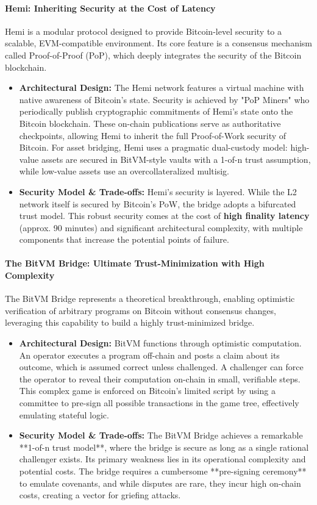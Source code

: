\documentclass{DESSThesis}
\begin{document}
\paragraph{Hemi: Inheriting Security at the Cost of Latency}
Hemi \cite{hemi2025} is a modular protocol designed to provide Bitcoin-level security to a scalable, EVM-compatible environment. Its core feature is a consensus mechanism called Proof-of-Proof (PoP), which deeply integrates the security of the Bitcoin blockchain.
\begin{itemize}
    \item \textbf{Architectural Design:} The Hemi network features a virtual machine with native awareness of Bitcoin's state. Security is achieved by "PoP Miners" who periodically publish cryptographic commitments of Hemi's state onto the Bitcoin blockchain. These on-chain publications serve as authoritative checkpoints, allowing Hemi to inherit the full Proof-of-Work security of Bitcoin. For asset bridging, Hemi uses a pragmatic dual-custody model: high-value assets are secured in BitVM-style vaults with a 1-of-n trust assumption, while low-value assets use an overcollateralized multisig.
    \item \textbf{Security Model \& Trade-offs:} Hemi's security is layered. While the L2 network itself is secured by Bitcoin's PoW, the bridge adopts a bifurcated trust model. This robust security comes at the cost of \textbf{high finality latency} (approx. 90 minutes) and significant architectural complexity, with multiple components that increase the potential points of failure.
\end{itemize}

\paragraph{The BitVM Bridge: Ultimate Trust-Minimization with High Complexity}
The BitVM Bridge \cite{linus_bitvm2_nodate} represents a theoretical breakthrough, enabling optimistic verification of arbitrary programs on Bitcoin without consensus changes, leveraging this capability to build a highly trust-minimized bridge.
\begin{itemize}
    \item \textbf{Architectural Design:} BitVM functions through optimistic computation. An operator executes a program off-chain and posts a claim about its outcome, which is assumed correct unless challenged. A challenger can force the operator to reveal their computation on-chain in small, verifiable steps. This complex game is enforced on Bitcoin's limited script by using a committee to pre-sign all possible transactions in the game tree, effectively emulating stateful logic.
    \item \textbf{Security Model \& Trade-offs:} The BitVM Bridge achieves a remarkable **1-of-n trust model**, where the bridge is secure as long as a single rational challenger exists. Its primary weakness lies in its operational complexity and potential costs. The bridge requires a cumbersome **pre-signing ceremony** to emulate covenants, and while disputes are rare, they incur high on-chain costs, creating a vector for griefing attacks.
\end{itemize}
\end{document}
